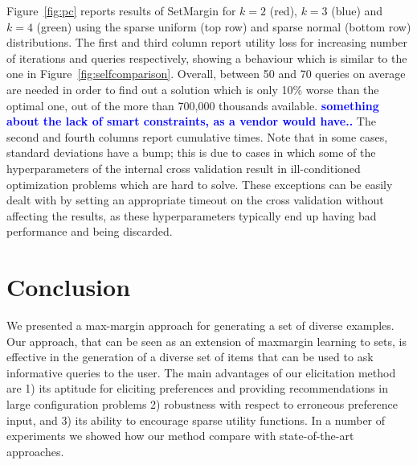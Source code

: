 \documentclass{article}
\renewcommand\[{\begin{equation}}
\renewcommand\]{\end{equation}}
\newcommand{\andrea}[1]{{\bf \textcolor{blue}{{\fbox{Andrea:} #1}}}}
\begin{document}
Figure~\ref{fig:pc} reports results of {\sc SetMargin} for $k=2$
(red), $k=3$ (blue) and $k=4$ (green) using the sparse uniform (top
row) and sparse normal (bottom row) distributions. The first and third
column report utility loss for increasing number of iterations and
queries respectively, showing a behaviour which is similar to the one
in Figure~\ref{fig:selfcomparison}. Overall, between 50 and 70 queries
on average are needed in order to find out a solution which is only
10\% worse than the optimal one, out of the more than 700,000
thousands available. \andrea{something about the lack of smart
  constraints, as a vendor would have..}  The second and fourth
columns report cumulative times. Note that in some cases, standard
deviations have a bump; this is due to cases in which some of the
hyperparameters of the internal cross validation result in
ill-conditioned optimization problems which are hard to solve. These
exceptions can be easily dealt with by setting an appropriate timeout
on the cross validation without affecting the results, as these
hyperparameters typically end up having bad performance and being
discarded.



\section{Conclusion}
\label{sec:conclusions}

We presented a max-margin approach for generating a set of diverse
examples.  Our approach, that can be seen as an extension of maxmargin
learning to sets, is effective in the generation of a diverse set of
items that can be used to ask informative queries to the user.  The
main advantages of our elicitation method are 1) its aptitude for
eliciting preferences and providing recommendations in large
configuration problems 2) robustness with respect to erroneous
preference input, and 3) its ability to encourage sparse utility
functions.  In a number of experiments we showed how our method
compare with state-of-the-art approaches.
\end{document}
